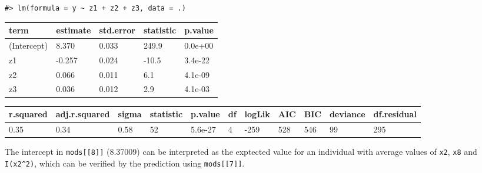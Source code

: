 \documentclass[main.tex]{subfiles}
\begin{document}
\begin{verbatim}
#> lm(formula = y ~ z1 + z2 + z3, data = .)
\end{verbatim}

\begin{table}[H]
\centering
\begin{tabular}{lllll}
\toprule
term & estimate & std.error & statistic & p.value\\
\midrule
(Intercept) & 8.370 & 0.033 & 249.9 & 0.0e+00\\
z1 & -0.257 & 0.024 & -10.5 & 3.4e-22\\
z2 & 0.066 & 0.011 & 6.1 & 4.1e-09\\
z3 & 0.036 & 0.012 & 2.9 & 4.1e-03\\
\bottomrule
\end{tabular}
\end{table}

\begin{table}[H]
\centering
\begin{tabular}{lllllllllll}
\toprule
r.squared & adj.r.squared & sigma & statistic & p.value & df & logLik & AIC & BIC & deviance & df.residual\\
\midrule
0.35 & 0.34 & 0.58 & 52 & 5.6e-27 & 4 & -259 & 528 & 546 & 99 & 295\\
\bottomrule
\end{tabular}
\end{table}

The intercept in \texttt{mods{[}{[}8{]}{]}} (8.37009) can be interpreted
as the exptected value for an individual with average values of
\texttt{x2}, \texttt{x8} and \texttt{I(x2\^{}2)}, which can be verified
by the prediction using \texttt{mods{[}{[}7{]}{]}}.

\begin{Shaded}
\begin{Highlighting}[]
\NormalTok{( } \OperatorTok{-}\StringTok{ } \OperatorTok{*}\StringTok{ }\OperatorTok{$}\OperatorTok{+}\StringTok{ } \OperatorTok{*}\StringTok{ }\OperatorTok{$}\OperatorTok{+}\StringTok{ }
\StringTok{  } \OperatorTok{*}\StringTok{ }\OperatorTok{$}\OperatorTok{^}\NormalTok{) ) }\OperatorTok{-}\StringTok{ } \OperatorTok{<=}\StringTok{ }
\end{Highlighting}
\end{Shaded}
\end{document}

